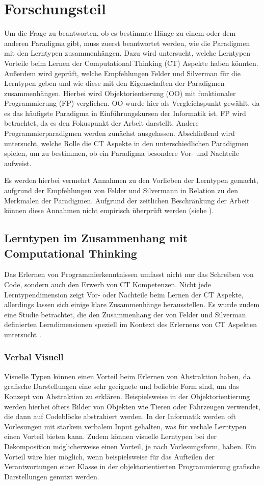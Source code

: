 \clearpage
\section{Forschungsteil}
\label{sec:work}

Um die Frage zu beantworten, ob es bestimmte Hänge zu einem oder dem anderen Paradigma gibt, muss zuerst beantwortet werden, wie die Paradigmen mit den Lerntypen zusammenhängen. 
Dazu wird untersucht, welche Lerntypen Vorteile beim Lernen der Computational Thinking (CT) Aspekte haben könnten. Außerdem wird geprüft, welche Empfehlungen Felder und Silverman für die Lerntypen geben und wie diese mit den Eigenschaften der Paradigmen zusammenhängen.
Hierbei wird Objektorientierung (OO) mit funktionaler Programmierung (FP) verglichen. OO wurde hier als Vergleichspunkt gewählt, da es das häufigste Paradigma in Einführungskursen der Informatik ist. FP wird betrachtet, da es den Fokuspunkt der Arbeit darstellt. Andere Programmierparadigmen werden zunächst ausgelassen.
Abschließend wird untersucht, welche Rolle die CT Aspekte in den unterschiedlichen Paradigmen spielen, um zu bestimmen, ob ein Paradigma besondere Vor- und Nachteile aufweist.

Es werden hierbei vermehrt Annahmen zu den Vorlieben der Lerntypen gemacht, aufgrund der Empfehlungen von Felder und Silvermann in Relation zu den Merkmalen der Paradigmen. Aufgrund der zeitlichen Beschränkung der Arbeit können diese Annahmen nicht empirisch überprüft werden (siehe ).

\subsection{Lerntypen im Zusammenhang mit Computational Thinking}
Das Erlernen von Programmierkenntnissen umfasst nicht nur das Schreiben von Code, sondern auch den Erwerb von CT Kompetenzen.
Nicht jede Lerntypendimension zeigt Vor- oder Nachteile beim Lernen der CT Aspekte, allerdings lassen sich einige klare Zusammenhänge herausstellen. Es wurde zudem eine Studie betrachtet, die den Zusammenhang der von Felder und Silverman definierten Lerndimensionen speziell im Kontext des Erlernens von CT Aspekten untersucht \cite{chen}.

\subsubsection{Verbal Visuell}
Visuelle Typen können einen Vorteil beim Erlernen von Abstraktion haben, da grafische Darstellungen eine sehr geeignete und beliebte Form sind, um das Konzept von Abstraktion zu erklären. Beispielsweise in der Objektorientierung werden hierbei öfters Bilder von Objekten wie Tieren oder Fahrzeugen verwendet, die dann auf Codeblöcke abstrahiert werden.
In der Informatik werden oft Vorlesungen mit starkem verbalem Input gehalten, was für verbale Lerntypen einen Vorteil bieten kann.
Zudem können visuelle Lerntypen bei der Dekomposition möglicherweise einen Vorteil, je nach Vorlesungsform, haben. Ein Vorteil wäre hier möglich, wenn beispielsweise für das Aufteilen der Verantwortungen einer Klasse in der objektorientierten Programmierung grafische Darstellungen genutzt werden.

